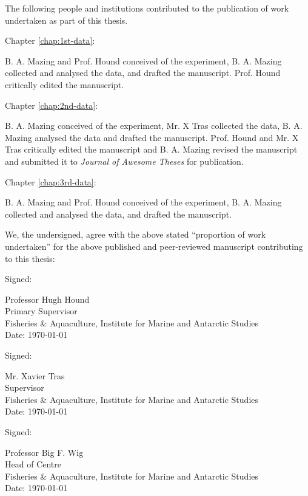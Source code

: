The following people and institutions contributed to the publication of work undertaken as part of this thesis.

Chapter \ref{chap:1st-data}: 

B. A. Mazing and Prof. Hound conceived of the experiment, B. A. Mazing collected and analysed the data, and drafted the manuscript. Prof. Hound critically edited the manuscript.

Chapter \ref{chap:2nd-data}: 

B. A. Mazing conceived of the experiment, Mr. X Tras collected the data, B. A. Mazing analysed the data and drafted the manuscript. Prof. Hound and Mr. X Tras critically edited the manuscript and B. A. Mazing revised the manuscript and submitted it to \textit{Journal of Awesome Theses} for publication.

Chapter \ref{chap:3rd-data}: 

B. A. Mazing and Prof. Hound conceived of the experiment, B. A. Mazing collected and analysed the data, and drafted the manuscript.

\vspace*{1cm}
We, the undersigned, agree with the above stated ``proportion of work undertaken'' for the above published and peer-reviewed manuscript contributing to this thesis:

\vspace*{2cm}
Signed: \hrulefill

\hspace*{0mm}\phantom{Signed: }Professor Hugh Hound \\
\hspace*{0mm}\phantom{Signed: }Primary Supervisor \\        
\hspace*{0mm}\phantom{Signed: }Fisheries \& Aquaculture, Institute for Marine and Antarctic Studies \\ 
\hspace*{0mm}\phantom{Signed: }Date: \today

\vspace*{2cm}
Signed: \hrulefill

\hspace*{0mm}\phantom{Signed: }Mr. Xavier Tras \\ 
\hspace*{0mm}\phantom{Signed: }Supervisor \\       
\hspace*{0mm}\phantom{Signed: }Fisheries \& Aquaculture, Institute for Marine and Antarctic Studies \\ 
\hspace*{0mm}\phantom{Signed: }Date: \today

\vspace*{2cm}
Signed: \hrulefill

\hspace*{0mm}\phantom{Signed: }Professor Big F. Wig \\
\hspace*{0mm}\phantom{Signed: }Head of Centre \\
\hspace*{0mm}\phantom{Signed: }Fisheries \& Aquaculture, Institute for Marine and Antarctic Studies \\	
\hspace*{0mm}\phantom{Signed: }Date: \today
